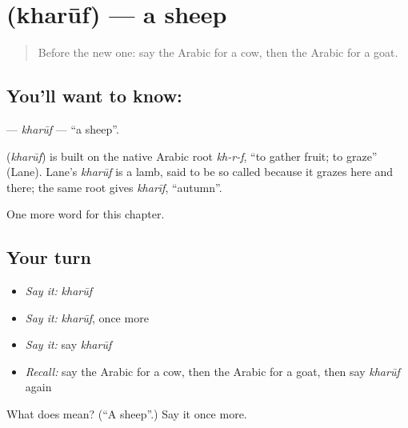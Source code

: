 \section[\texorpdfstring{\ar{خروف} (kharūf)}{خروف (kharūf)}]{ (kharūf) — a sheep}

\label{lesson:AR-C79-kharuf}



\begin{quote}
Before the new one: say the Arabic for a cow, then the Arabic for a goat.
\end{quote}

\subsection*{You'll want to know: }
\textbf{} — \emph{kharūf} — \textquotedblleft{}a sheep\textquotedblright{}.

\begin{cousinweb}
\textbf{} (\emph{kharūf}) is built on the native Arabic root \emph{kh-r-f}, \textquotedblleft{}to gather fruit; to graze\textquotedblright{} (Lane). Lane's \emph{kharūf} is a lamb, said to be so called because it grazes here and there; the same root gives \emph{kharīf}, \textquotedblleft{}autumn\textquotedblright{}.
\end{cousinweb}

\begin{grammarlens}[title={What you've built}]
One more word for this chapter.
\end{grammarlens}

\subsection*{Your turn}
\begin{itemize}
\raggedright
  \item \emph{Say it:} \emph{kharūf}
  \item \emph{Say it:} \emph{kharūf}, once more
  \item \emph{Say it:} say \emph{kharūf}
  \item \emph{Recall:} say the Arabic for a cow, then the Arabic for a goat, then say \emph{kharūf} again
\end{itemize}

\begin{tcolorbox}[breakable,colback=teal!4,colframe=teal!35!black,title={Before you move on}]
What does  mean? (\textquotedblleft{}A sheep\textquotedblright{}.) Say it once more.
\end{tcolorbox}
